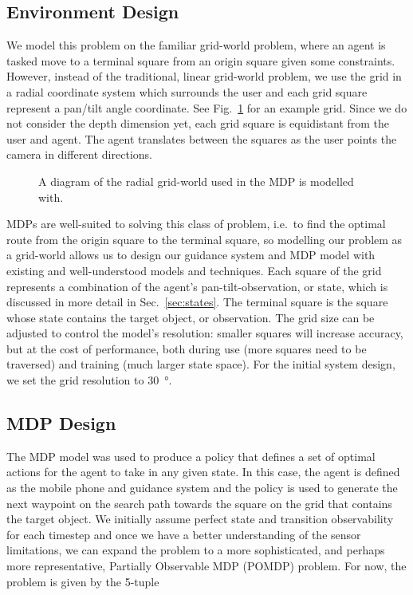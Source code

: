 \documentclass[a4paper, twoside]{article}
\begin{document}
\subsection{Environment Design}\label{sec:env-design}

\noindent We model this problem on the familiar grid-world problem, where an agent is tasked move to a terminal square from an origin square given some constraints. However, instead of the traditional, linear grid-world problem, we use the grid in a radial coordinate system which surrounds the user and each grid square represent a pan/tilt angle coordinate. See Fig.~\ref{fig:environment} for an example grid. Since we do not consider the depth dimension yet, each grid square is equidistant from the user and agent. The agent translates between the squares as the user points the camera in different directions.

\begin{figure}  
  \centering
  
\caption{A diagram of the radial grid-world used in the MDP is modelled with. }\label{fig:environment}
\end{figure}

MDPs are well-suited to solving this class of problem, i.e.\ to find the optimal route from the origin square to the terminal square, so modelling our problem as a grid-world allows us to design our guidance system and MDP model with existing and well-understood models and techniques. Each square of the grid represents a combination of the agent's pan-tilt-observation, or state, which is discussed in more detail in Sec.~\ref{sec:states}. The terminal square is the square whose state contains the target object, or observation. The grid size can be adjusted to control the model's resolution: smaller squares will increase accuracy, but at the cost of performance, both during use (more squares need to be traversed) and training (much larger state space). For the initial system design, we set the grid resolution to \SI{30}{\degree}.

\subsection{MDP Design}

\noindent The MDP model was used to produce a policy that defines a set of optimal actions for the agent to take in any given state. In this case, the agent is defined as the mobile phone and guidance system and the policy is used to generate the next waypoint on the search path towards the square on the grid that contains the target object. We initially assume perfect state and transition observability for each timestep and once we have a better understanding of the sensor limitations, we can expand the problem to a more sophisticated, and perhaps more representative, Partially Observable MDP (POMDP) problem. For now, the problem is given by the 5-tuple
\end{document}
